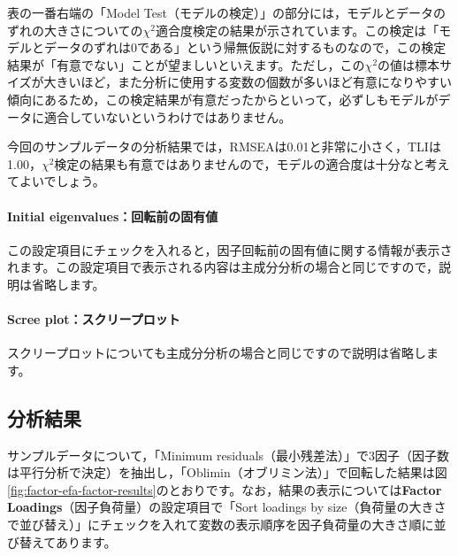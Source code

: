 \documentclass[
  12pt,
  a5jpaper,
  lualatex, ja=standard]{bxjsbook}
\begin{document}
表の一番右端の「Model Test（モデルの検定）」の部分には，モデルとデータのずれの大きさについての\(\chi^2\)適合度検定の結果が示されています。この検定は「モデルとデータのずれは0である」という帰無仮説に対するものなので，この検定結果が「有意でない」ことが望ましいといえます。ただし，この\(\chi^2\)の値は標本サイズが大きいほど，また分析に使用する変数の個数が多いほど有意になりやすい傾向にあるため，この検定結果が有意だったからといって，必ずしもモデルがデータに適合していないというわけではありません。

今回のサンプルデータの分析結果では，RMSEAは0.01と非常に小さく，TLIは1.00，\(\chi^2\)検定の結果も有意ではありませんので，モデルの適合度は十分なと考えてよいでしょう。

\hypertarget{subsub:factor-efa-initial-eigenvalues}{%
\paragraph*{Initial eigenvalues：回転前の固有値}\label{subsub:factor-efa-initial-eigenvalues}}

この設定項目にチェックを入れると，因子回転前の固有値に関する情報が表示されます。この設定項目で表示される内容は主成分分析の場合と同じですので，説明は省略します。

\hypertarget{subsub:factor-efa-scree-plot}{%
\paragraph*{Scree plot：スクリープロット}\label{subsub:factor-efa-scree-plot}}

スクリープロットについても主成分分析の場合と同じですので説明は省略します。

\hypertarget{sub:factor-efa-results}{%
\subsection{分析結果}\label{sub:factor-efa-results}}

サンプルデータについて，「Minimum residuals（最小残差法）」で3因子（因子数は平行分析で決定）を抽出し，「Oblimin（オブリミン法）」で回転した結果は図\ref{fig:factor-efa-factor-results}のとおりです。なお，結果の表示については\textbf{Factor Loadings}（因子負荷量）の設定項目で「Sort loadings by size（負荷量の大きさで並び替え）」にチェックを入れて変数の表示順序を因子負荷量の大きさ順に並び替えてあります。
\end{document}
